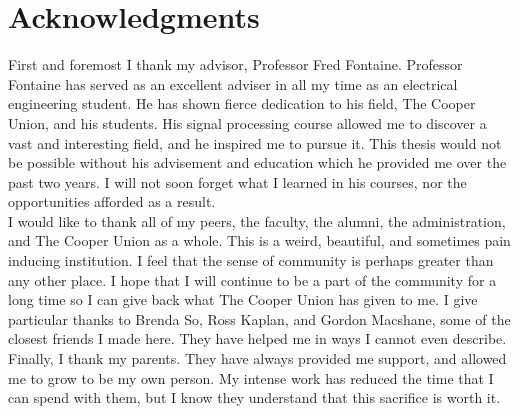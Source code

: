 {
\centering
\section*{Acknowledgments}
}
\doublespacing
\noindent
First and foremost I thank my advisor, Professor Fred Fontaine.  Professor Fontaine has served as an excellent adviser in all my time as an electrical engineering student.  He has shown fierce dedication to his field, The Cooper Union, and his students.  His signal processing course allowed me to discover a vast and interesting field, and he inspired me to pursue it.  This thesis would not be possible without his advisement and education which he provided me over the past two years.  I will not soon forget what I learned in his courses, nor the opportunities afforded as a result. \\

\noindent
I would like to thank all of my peers, the faculty, the alumni, the administration, and The Cooper Union as a whole.  This is a weird, beautiful, and sometimes pain inducing institution.  I feel that the sense of community is perhaps greater than any other place.  I hope that I will continue to be a part of the community for a long time so I can give back what The Cooper Union has given to me.  I give particular thanks to Brenda So, Ross Kaplan, and Gordon Macshane, some of the closest friends I made here.  They have helped me in ways I cannot even describe.\\

\noindent
Finally, I thank my parents.  They have always provided me support, and allowed me to grow to be my own person.  My intense work has reduced the time that I can spend with them, but I know they understand that this sacrifice is worth it. 
